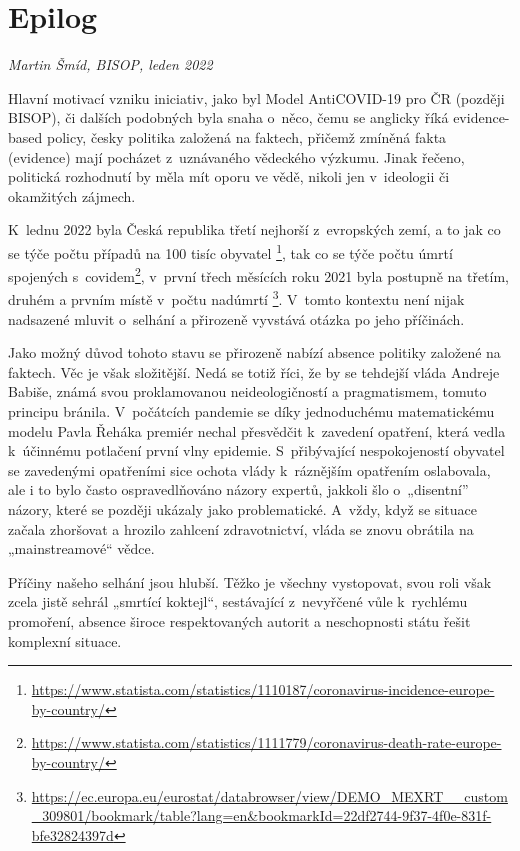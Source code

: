 \chapter{Epilog}

\textit{Martin Šmíd, BISOP, leden 2022}

\vspace{15mm}

Hlavní motivací vzniku iniciativ, jako byl Model AntiCOVID-19 pro ČR (později BISOP), či dalších podobných byla snaha o~něco, čemu se anglicky říká evidence-based policy, česky politika založená na faktech, přičemž zmíněná fakta (evidence) mají pocházet z~uznávaného vědeckého výzkumu. Jinak řečeno, politická rozhodnutí by měla mít oporu ve vědě, nikoli jen v~ideologii či okamžitých zájmech. 

K~lednu 2022 byla Česká republika třetí nejhorší z~evropských zemí, a to jak co se týče počtu případů na 100 tisíc obyvatel \footnote{\url{https://www.statista.com/statistics/1110187/coronavirus-incidence-europe-by-country/}}, tak co se týče počtu úmrtí spojených s~covidem\footnote{\url{https://www.statista.com/statistics/1111779/coronavirus-death-rate-europe-by-country/}}, v~první třech měsících roku 2021 byla postupně na třetím, druhém a prvním místě v~počtu nadúmrtí \footnote{\url{https://ec.europa.eu/eurostat/databrowser/view/DEMO_MEXRT__custom_309801/bookmark/table?lang=en&bookmarkId=22df2744-9f37-4f0e-831f-bfe32824397d}}. V~tomto kontextu není nijak nadsazené mluvit o~selhání a přirozeně vyvstává otázka po jeho příčinách. 


Jako možný důvod tohoto stavu se přirozeně nabízí absence politiky založené na faktech. Věc je však složitější. Nedá se totiž říci, že by se tehdejší vláda Andreje Babiše, známá svou proklamovanou neideologičností a pragmatismem, tomuto principu bránila. V~počátcích pandemie se díky jednoduchému matematickému modelu Pavla Řeháka premiér nechal přesvědčit k~zavedení opatření, která vedla k~účinnému potlačení první vlny epidemie. S~přibývající nespokojeností obyvatel se zavedenými opatřeními sice ochota vlády k~ráznějším opatřením oslabovala, ale i to bylo často ospravedlňováno názory expertů, jakkoli šlo o~„disentní” názory, které se později ukázaly jako problematické. A~vždy, když se situace začala zhoršovat a hrozilo zahlcení zdravotnictví, vláda se znovu obrátila na „mainstreamové“ vědce.

Příčiny našeho selhání jsou hlubší. Těžko je všechny vystopovat, svou roli však zcela jistě sehrál „smrtící koktejl“, sestávající z~nevyřčené vůle k~rychlému promoření, absence široce respektovaných autorit a neschopnosti státu řešit komplexní situace.

